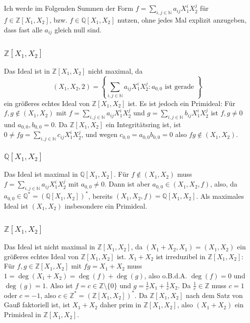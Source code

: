 \documentclass[a4paper,10pt]{article}
\theoremstyle{definition}
\newcommand{\N}{\mathbb{N}}
\newcommand{\Z}{\mathbb{Z}}
\newcommand{\Q}{\mathbb{Q}}
\begin{document}
\section{}
Ich werde im Folgenden Summen der Form $f = \sum_{i,j \in \N} a_{ij} X_1^i X_2^j$ für $f \in \Z[X_1, X_2]$, bzw. $f \in \Q[X_1, X_2]$ nutzen, ohne jedes Mal explizit anzugeben, dass fast alle $a_{ij}$ gleich null sind.


\subsection{}

\subsubsection{$\Z[X_1, X_2]$}
Das Ideal ist in $\Z[X_1, X_2]$ nicht maximal, da
\[
 (X_1, X_2, 2) = \left\{\sum_{i,j \in \N} a_{ij} X_1^i X_2^j : a_{0,0} \text{ ist gerade }\right\}
\]
ein größeres echtes Ideal von $\Z[X_1, X_2]$ ist. Es ist jedoch ein Primideal: Für $f,g \not\in (X_1, X_2)$ mit $f = \sum_{i,j \in \N} a_{ij} X^i_1 X^j_2$ und $g = \sum_{i,j \in \N} b_{ij} X^i_1 X^j_2$ ist $f,g \neq 0$ und $a_{0,0}, b_{0,0} = 0$. Da $\Z[X_1, X_2]$ ein Integritätsring ist, ist $0 \neq fg = \sum_{i,j \in \N} c_{ij} X^i_1 X^j_2$, und wegen $c_{0,0} = a_{0,0} b_{0,0} = 0$ also $fg \not\in (X_1, X_2)$.

\subsubsection{$\Q[X_1, X_2]$}
Das Ideal ist maximal in $\Q[X_1, X_2]$. Für $f \not\in (X_1, X_2)$ muss $f=\sum_{i,j \in \N} a_{ij} X^i_1 X^j_2$ mit $a_{0,0} \neq 0$. Dann ist aber $a_{0,0} \in (X_1, X_2, f)$, also, da $a_{0,0} \in \Q^* = (\Q[X_1, X_2])^*$, bereits $(X_1, X_2, f) = \Q[X_1, X_2]$. Als maximales Ideal ist $(X_1, X_2)$ insbesondere ein Primideal.


\subsection{}

\subsubsection{$\Z[X_1, X_2]$}
Das Ideal ist nicht maximal in $\Z[X_1, X_2]$, da $(X_1+X_2, X_1) = (X_1, X_2)$ ein größeres echtes Ideal von $\Z[X_1, X_2]$ ist. $X_1+X_2$ ist irreduzibel in $\Z[X_1, X_2]$: Für $f,g \in \Z[X_1, X_2]$ mit $fg = X_1 + X_2$ muss $1 = \deg(X_1 + X_2) = \deg(f) + \deg(g)$, also o.B.d.A. $\deg(f) = 0$ und $\deg(g) = 1$. Also ist $f = c \in \Z\setminus\{0\}$ und $g = \frac{1}{c}X_1 + \frac{1}{c}X_2$. Da $\frac{1}{c} \in \Z$ muss $c=1$ oder $c=-1$, also $c \in \Z^* = (\Z[X_1, X_2])^*$. Da $\Z[X_1, X_2]$ nach dem Satz von Gauß faktoriell ist, ist $X_1+X_2$ daher prim in $\Z[X_1, X_2]$, also $(X_1+X_2)$ ein Primideal in $\Z[X_1, X_2]$.
\end{document}
